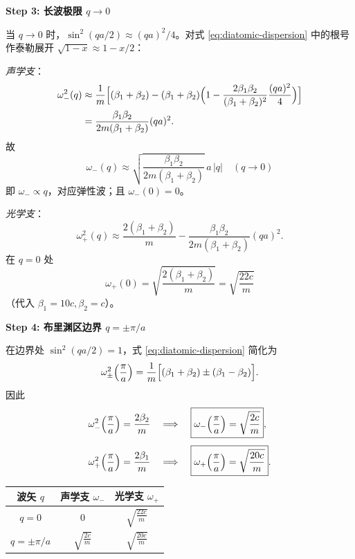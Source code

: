 \begin{derivationbox}[标准解题过程]
\textbf{Step 3: 长波极限 $q\to 0$}

当 $q\to0$ 时，$\sin^2(qa/2)\approx (qa)^2/4$。对式 \eqref{eq:diatomic-dispersion} 中的根号作泰勒展开 $\sqrt{1-x}\approx 1-x/2$：

\textit{声学支}：
\begin{align}
    \omega_-^2(q) &\approx \frac{1}{m}\Bigl[(\beta_1+\beta_2) - (\beta_1+\beta_2)\Bigl(1-\frac{2\beta_1\beta_2}{(\beta_1+\beta_2)^2}\frac{(qa)^2}{4}\Bigr)\Bigr] \nonumber\\
    &= \frac{\beta_1\beta_2}{2m(\beta_1+\beta_2)}(qa)^2.
\end{align}
故
\begin{equation}
\boxed{\omega_-(q) \approx \sqrt{\frac{\beta_1\beta_2}{2m(\beta_1+\beta_2)}}\,a\,|q| \quad (q\to0)}
\end{equation}
即 $\omega_-\propto q$，对应弹性波；且 $\omega_-(0)=0$。

\textit{光学支}：
\begin{equation}
    \omega_+^2(q) \approx \frac{2(\beta_1+\beta_2)}{m} - \frac{\beta_1\beta_2}{2m(\beta_1+\beta_2)}(qa)^2.
\end{equation}
在 $q=0$ 处
\begin{equation}
\boxed{\omega_+(0) = \sqrt{\frac{2(\beta_1+\beta_2)}{m}} = \sqrt{\frac{22c}{m}}}
\end{equation}
（代入 $\beta_1=10c,\beta_2=c$）。

\textbf{Step 4: 布里渊区边界 $q=\pm\pi/a$}

在边界处 $\sin^2(qa/2)=1$，式 \eqref{eq:diatomic-dispersion} 简化为
\begin{equation}
    \omega_{\pm}^2\Bigl(\frac{\pi}{a}\Bigr) = \frac{1}{m}\Bigl[(\beta_1+\beta_2)\pm(\beta_1-\beta_2)\Bigr].
\end{equation}
因此
\begin{align}
    \omega_-^2\Bigl(\frac{\pi}{a}\Bigr) &= \frac{2\beta_2}{m} \quad\Longrightarrow\quad \boxed{\omega_-\Bigl(\frac{\pi}{a}\Bigr)=\sqrt{\frac{2c}{m}}}, \\[4pt]
    \omega_+^2\Bigl(\frac{\pi}{a}\Bigr) &= \frac{2\beta_1}{m} \quad\Longrightarrow\quad \boxed{\omega_+\Bigl(\frac{\pi}{a}\Bigr)=\sqrt{\frac{20c}{m}}}.
\end{align}
\end{derivationbox}

\begin{formulabox}[答案汇总]
\begin{center}
\begin{tabular}{ccc}
\toprule
波矢 $q$ & 声学支 $\omega_-$ & 光学支 $\omega_+$ \\
\midrule
$q=0$ & $0$ & $\displaystyle\sqrt{\frac{22c}{m}}$ \\[6pt]
$q=\pm\pi/a$ & $\displaystyle\sqrt{\frac{2c}{m}}$ & $\displaystyle\sqrt{\frac{20c}{m}}$ \\
\bottomrule
\end{tabular}
\end{center}
\end{formulabox}


